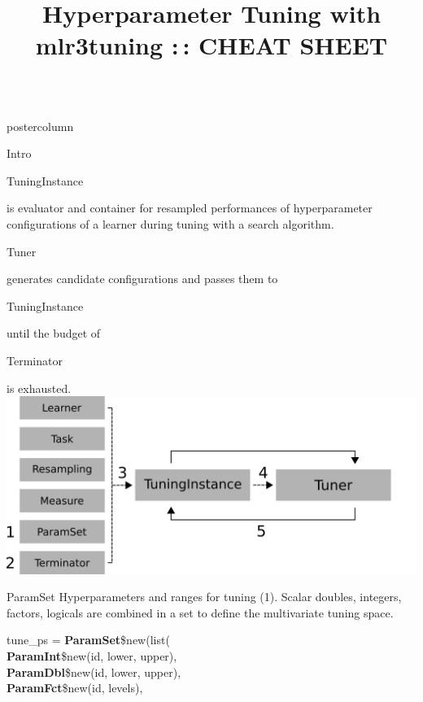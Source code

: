 \documentclass{beamer}
\title{Hyperparameter Tuning with mlr3tuning :\,: CHEAT SHEET} %
\newlength{\columnheight} %
\newcommand{\codeinline}[1]{\begin{codeboxinline}#1\end{codeboxinline}}
\begin{document}
\begin{frame}[fragile]{}
	\begin{columns}
		\begin{column}{.245\textwidth}
			\begin{beamercolorbox}[center]{postercolumn}
				\begin{minipage}{.98\textwidth}
					\parbox[t][\columnheight]{\textwidth}{
						\begin{myblock}{Intro}
							\codeinline{TuningInstance} is evaluator 
							and container for resampled performances 
							of hyperparameter configurations of a learner 
							during tuning with a search algorithm. 
                            \codeinline{Tuner} generates candidate configurations 
                            and passes them to \codeinline{TuningInstance} 
                            until the budget of \codeinline{Terminator} is exhausted. 
							\vspace{1em}
							\\
                            \includegraphics[width=\textwidth]{img/tuning_objects.png}
						\end{myblock}
						\begin{myblock}{ParamSet}
					        Hyperparameters and ranges for tuning (1). 
					        Scalar doubles, integers, factors, logicals are combined 
					        in a set to define the multivariate tuning space.
							\\
							\begin{codeboxmultiline}[width=20.75cm]
								tune\_ps = \textbf{ParamSet}\$new(list(\\
								\hspace*{1ex}\textbf{ParamInt}\$new(id, lower, upper),\\
								\hspace*{1ex}\textbf{ParamDbl}\$new(id, lower, upper),\\
								\hspace*{1ex}\textbf{ParamFct}\$new(id, levels),\\

\end{codeboxmultiline}
\end{myblock}}
\end{minipage}
\end{beamercolorbox}
\end{column}
\end{columns}
\end{frame}
\end{document}
